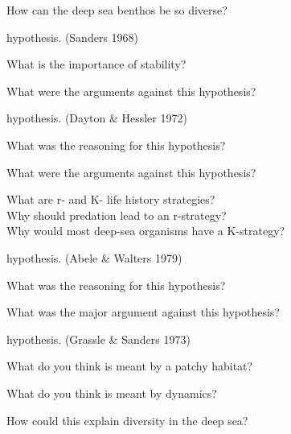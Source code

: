 \documentclass[t]{beamer}
\begin{document}

{
\begin{frame}[t]{How can the deep sea benthos be so diverse?}


\end{frame}}



\begin{frame}[t]{ hypothesis. {\large (Sanders 1968)}}

	\hangpara What is the importance of stability?

	\hangpara What were the arguments against this hypothesis?

\end{frame}

\begin{frame}[t]{ hypothesis. {\large (Dayton \& Hessler 1972)}}

	\hangpara What was the reasoning for this hypothesis?

	\hangpara What were the arguments against this hypothesis?

	\hangpara What are r- and K- life history strategies?\\ Why should predation lead to an r-strategy?\\ Why would most deep-sea organisms have a K-strategy?


\end{frame}

\begin{frame}[t]{ hypothesis. {\large (Abele \& Walters 1979)}}

	\hangpara What was the reasoning for this hypothesis?

	\hangpara What was the major argument against this hypothesis?

\end{frame}

\begin{frame}[t]{ hypothesis. {\large (Grassle \& Sanders 1973)}}

	\hangpara What do you think is meant by a patchy habitat?

	\hangpara What do you think is meant by dynamics?
	
	\hangpara How could this explain diversity in the deep sea?

\end{frame}
\end{document}

